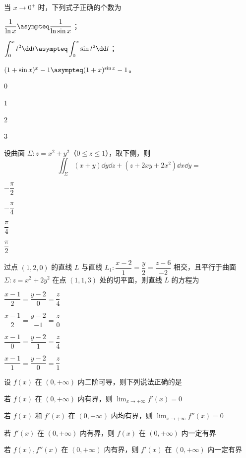 
\begin{question}[index=1]
当 $x\to0^+$ 时，下列式子正确的个数为
\par{} $\dfrac{1}{\ln x}\asympteq\dfrac{1}{\ln\sin x}$；
\par{} $\displaystyle\int_0^x t^2\dd t\asympteq\int_0^x\sin t^2\dd t$；
\par{} $(1+\sin x)^x-1\asympteq(1+x)^{\sin x}-1$。
\begin{choices}[columns=4]
\item $0$
\item $1$
\item $2$
\item $3$
\end{choices}
\end{question}
\QuestionBreak

\begin{question}[index=2]
设曲面 $\Sigma:z=x^2+y^2$（$0\leq z\leq1$），取下侧，则
\[
\iint_{\Sigma}(x+y)\dd y\dd z+(z+2xy+2x^2)\dd x\dd y=
\]
\begin{choices}[columns=4]
\item $-\dfrac{\pi}{2}$
\item $-\dfrac{\pi}{4}$
\item $\dfrac{\pi}{4}$
\item $\dfrac{\pi}{2}$
\end{choices}
\end{question}
\QuestionBreak

\begin{question}[index=3]
过点 $(1,2,0)$ 的直线 $L$ 与直线 $L_1:\dfrac{x-2}{1}=\dfrac{y}{2}=\dfrac{z-6}{-2}$ 相交，且平行于曲面 $\Sigma:z=x^2+2y^2$ 在点 $(1,1,3)$ 处的切平面，则直线 $L$ 的方程为
\begin{choices}[columns=2]
\item $\dfrac{x-1}{2}=\dfrac{y-2}{0}=\dfrac z4$
\item $\dfrac{x-1}{2}=\dfrac{y-2}{-1}=\dfrac z0$
\item $\dfrac{x-1}{0}=\dfrac{y-2}{1}=\dfrac z4$
\item $\dfrac{x-1}{1}=\dfrac{y-2}{0}=\dfrac z1$
\end{choices}
\end{question}
\QuestionBreak

\begin{question}[index=4]
设 $f(x)$ 在 $(0,+\infty)$ 内二阶可导，则下列说法正确的是
\begin{choices}[columns=1]
\item 若 $f(x)$ 在 $(0,+\infty)$ 内有界，则 $\displaystyle\lim_{x\to+\infty}f'(x)=0$
\item 若 $f(x)$ 和 $f'(x)$ 在 $(0,+\infty)$ 内均有界，则 $\displaystyle\lim_{x\to+\infty}f''(x)=0$
\item 若 $f'(x)$ 在 $(0,+\infty)$ 内有界，则 $f(x)$ 在 $(0,+\infty)$ 内一定有界
\item 若 $f(x),f''(x)$ 在 $(0,+\infty)$ 内有界，则 $f'(x)$ 在 $(0,+\infty)$ 内一定有界
\end{choices}
\end{question}
\QuestionBreak

